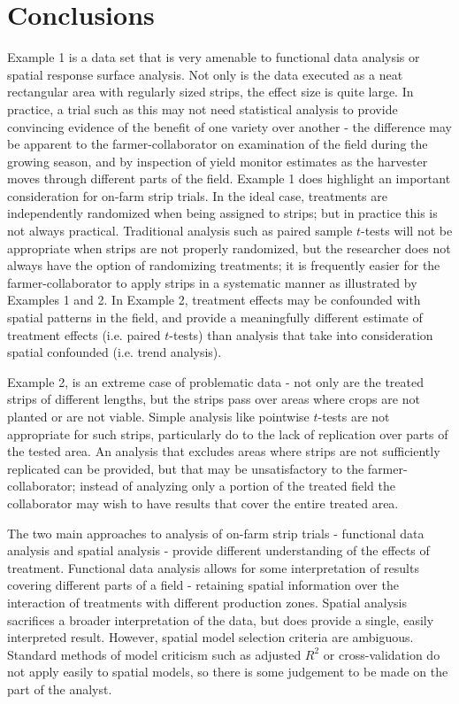 \documentclass[phdcss]{SDSUThesis}
\begin{document}
\clearpage

\chapter{Conclusions}\label{ConclusionsChapter}

Example 1 is a data set that is very amenable to functional data analysis or spatial response surface analysis. Not only is the data executed as a neat rectangular area with regularly sized strips, the effect size is quite large. In practice, a trial such as this may not need statistical analysis to provide convincing evidence of the benefit of one variety over another - the difference may be apparent to the farmer-collaborator on examination of the field during the growing season, and by inspection of yield monitor estimates as the harvester moves through different parts of the field. Example 1 does highlight an important consideration for on-farm strip trials. In the ideal case, treatments are independently randomized when being assigned to strips; but in practice this is not always practical. Traditional analysis such as paired sample $t$-tests will not be appropriate when strips are not properly randomized, but the researcher does not always have the option of randomizing treatments; it is frequently easier for the farmer-collaborator to apply strips in a systematic manner as illustrated by Examples 1 and 2. In Example 2, treatment effects may be confounded with spatial patterns in the field, and provide a meaningfully different estimate of treatment effects (i.e. paired $t$-tests) than analysis that take into consideration spatial confounded (i.e. trend analysis).

Example 2, is an extreme case of problematic data - not only are the treated strips of different lengths, but the strips pass over areas where crops are not planted or are not viable. Simple analysis like pointwise $t$-tests are not appropriate for such strips, particularly do to the lack of replication over parts of the tested area. An analysis that excludes areas where strips are not sufficiently replicated can be provided, but that may be unsatisfactory to the farmer-collaborator; instead of analyzing only a portion of the treated field the collaborator may wish to have results that cover the entire treated area.

The two main approaches to analysis of on-farm strip trials - functional data analysis and spatial analysis - provide different understanding of the effects of treatment. Functional data analysis allows for some interpretation of results covering different parts of a field - retaining spatial information over the interaction of treatments with different production zones. Spatial analysis sacrifices a broader interpretation of the data, but does provide a single, easily interpreted result. However, spatial model selection criteria are ambiguous. Standard methods of model criticism such as adjusted $R^2$ or cross-validation do not apply easily to spatial models, so there is some judgement to be made on the part of the analyst.
\end{document}
